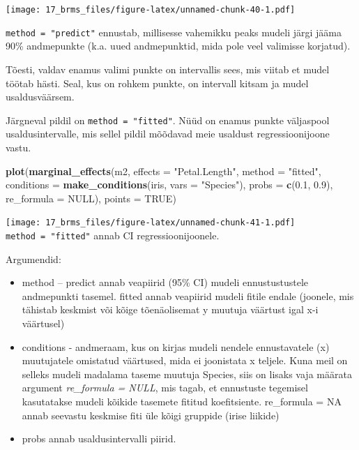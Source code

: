 \documentclass[]{book}
\newenvironment{Shaded}{\begin{snugshade}}{\end{snugshade}}
\newcommand{\KeywordTok}[1]{\textcolor[rgb]{0.13,0.29,0.53}{\textbf{#1}}}
\newcommand{\DataTypeTok}[1]{\textcolor[rgb]{0.13,0.29,0.53}{#1}}
\newcommand{\FloatTok}[1]{\textcolor[rgb]{0.00,0.00,0.81}{#1}}
\newcommand{\StringTok}[1]{\textcolor[rgb]{0.31,0.60,0.02}{#1}}
\newcommand{\OtherTok}[1]{\textcolor[rgb]{0.56,0.35,0.01}{#1}}
\newcommand{\NormalTok}[1]{#1}
\begin{document}
\texttt{[image: 17\_brms\_files/figure-latex/unnamed-chunk-40-1.pdf]}

\texttt{method\ =\ "predict"} ennustab, millisesse vahemikku peaks
mudeli järgi jääma 90\% andmepunkte (k.a. uued andmepunktid, mida pole
veel valimisse korjatud).

Tõesti, valdav enamus valimi punkte on intervallis sees, mis viitab et
mudel töötab hästi. Seal, kus on rohkem punkte, on intervall kitsam ja
mudel usaldusväärsem.

Järgneval pildil on \texttt{method\ =\ "fitted"}. Nüüd on enamus punkte
väljaspool usaldusintervalle, mis sellel pildil mõõdavad meie usaldust
regressioonijoone vastu.

\begin{Shaded}
\begin{Highlighting}[]
\KeywordTok{plot}\NormalTok{(}\KeywordTok{marginal_effects}\NormalTok{(m2, }\DataTypeTok{effects =} \StringTok{"Petal.Length"}\NormalTok{, }\DataTypeTok{method =} \StringTok{"fitted"}\NormalTok{, }\DataTypeTok{conditions =} \KeywordTok{make_conditions}\NormalTok{(iris, }\DataTypeTok{vars =} \StringTok{"Species"}\NormalTok{), }\DataTypeTok{probs =} \KeywordTok{c}\NormalTok{(}\FloatTok{0.1}\NormalTok{, }\FloatTok{0.9}\NormalTok{), }\DataTypeTok{re_formula =} \OtherTok{NULL}\NormalTok{), }\DataTypeTok{points =} \OtherTok{TRUE}\NormalTok{)}
\end{Highlighting}
\end{Shaded}

\texttt{[image: 17\_brms\_files/figure-latex/unnamed-chunk-41-1.pdf]}
\texttt{method\ =\ "fitted"} annab CI regressioonijoonele.

Argumendid:

\begin{itemize}
\item
  method -- predict annab veapiirid (95\% CI) mudeli ennustustustele
  andmepunkti tasemel. fitted annab veapiirid mudeli fitile endale
  (joonele, mis tähistab keskmist või kõige tõenäolisemat y muutuja
  väärtust igal x-i väärtusel)
\item
  conditions - andmeraam, kus on kirjas mudeli nendele ennustavatele (x)
  muutujatele omistatud väärtused, mida ei joonistata x teljele. Kuna
  meil on selleks mudeli madalama taseme muutuja Species, siis on lisaks
  vaja määrata argument \emph{re\_formula = NULL}, mis tagab, et
  ennustuste tegemisel kasutatakse mudeli kõikide tasemete fititud
  koefitsiente. re\_formula = NA annab seevastu keskmise fiti üle kõigi
  gruppide (irise liikide)
\item
  probs annab usaldusintervalli piirid.
\end{itemize}
\end{document}
